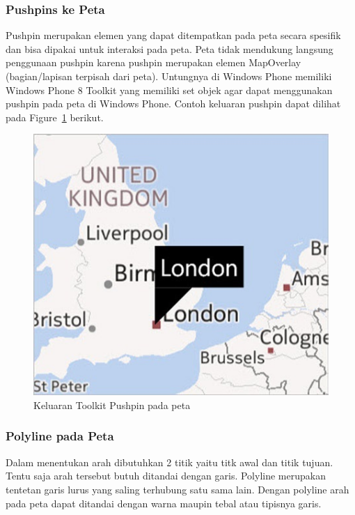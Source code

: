 \subsubsection{Pushpins ke Peta}
\label{subsubsec:Pushpins ke Peta}
\hspace{0.5cm} Pushpin merupakan elemen yang dapat ditempatkan pada peta secara spesifik dan bisa dipakai untuk interaksi pada peta. Peta tidak mendukung langsung penggunaan pushpin karena pushpin merupakan elemen MapOverlay (bagian/lapisan terpisah dari peta). Untungnya di Windows Phone memiliki Windows Phone 8 Toolkit yang memiliki set objek agar dapat menggunakan pushpin pada peta di Windows Phone. Contoh keluaran pushpin dapat dilihat pada Figure~\ref{fig:toolkit_pushpin} berikut.

\begin{figure}[!h]
	\centering
		\includegraphics[scale=0.5]{Gambar/toolkit_pushpin}
	\caption{Keluaran Toolkit Pushpin pada peta \cite{Manning}}
	\label{fig:toolkit_pushpin}
\end{figure}

\subsubsection{Polyline pada Peta}
\label{subsubsec:Polyline pada Peta}
\hspace{0.5cm} Dalam menentukan arah dibutuhkan 2 titik yaitu titk awal dan titik tujuan. Tentu saja arah tersebut butuh ditandai dengan garis. Polyline merupakan tentetan garis lurus yang saling terhubung satu sama lain. Dengan polyline arah pada peta dapat ditandai dengan warna maupin tebal atau tipisnya garis. 

